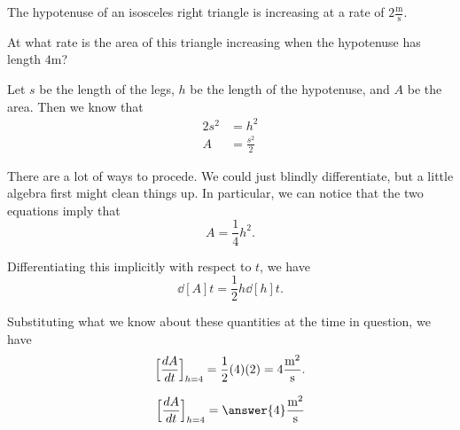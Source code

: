 \documentclass{ximera}
\author{Steven Gubkin}
\begin{document}
\begin{exercise}

The hypotenuse of an isosceles right triangle is increasing at a rate
of $2 \frac{\textrm{m}}{\textrm{s}}$.

At what rate is the area of this triangle increasing when the
hypotenuse has length $4 \textrm{m}$?

\begin{hint}
  Let $s$ be the length of the legs, $h$ be the length of the
  hypotenuse, and $A$ be the area.  Then we know that
\begin{align*}
	2s^2 &= h^2\\
	A &=\frac{s^2}{2}
\end{align*}
\end{hint}

\begin{hint}
  There are a lot of ways to procede.  We could just blindly
  differentiate, but a little algebra first might clean things up.  In
  particular, we can notice that the two equations imply that
\[
A = \frac{1}{4} h^2.
\]
\end{hint}

\begin{hint}
  Differentiating this implicitly with respect to $t$, we have
\[
\dd[A]{t} = \frac{1}{2} h \dd[h]{t}.
\]
\end{hint}

\begin{hint}
  Substituting what we know about these quantities at the time in
  question, we have
  \[
 \Bigl[ \dd[A]{t} \Bigr]_{h=4}= \frac{1}{2} (4) (2) = 4\frac{\textrm{m}^2}{\textrm{s}}.
  \]
\end{hint}

\begin{prompt}
  \[
 \Bigl[ \dd[A]{t} \Bigr]_{h=4} = \answer{4}\frac{\textrm{m}^2}{\textrm{s}}
  \]
\end{prompt}
\end{exercise}
\end{document}
